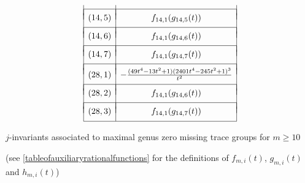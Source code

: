 \begin{table}[!ht]
\[\begin{array}{|c|c|}
& \\ [-.75em]
\hline 
& \\ [-.75em]
 (14,5) &  f_{14,1}(g_{14,5}(t)) \\
& \\ [-.75em]
\hline 
& \\ [-.75em]
(14,6) &  f_{14,1}(g_{14,6}(t))\\
& \\ [-.75em]
\hline 
& \\ [-.75em]
(14,7) &  f_{14,1}(g_{14,7}(t)) \\
& \\ [-.75em]
\hline
& \\ [-.75em]
(28,1) & - \frac{(49t^4 - 13t^2 + 1)(2401t^4 - 245t^2 + 1)^3}{t^2} \\
& \\ [-.75em]
\hline
& \\ [-.75em]
 (28,2) & f_{14,1}(g_{14,6}(t)) \\
& \\ [-.75em]
\hline 
& \\ [-.75em]
(28,3) &  f_{14,1}(g_{14,7}(t)) \\ [.5em]

\hline 
\end{array}
\]

\vspace{.1in}
\caption{ $j$-invariants associated to maximal genus zero missing trace groups for $m\geq10$}
\label{masterlistofjinvariants2}
\begin{center}
(see \ref{tableofauxiliaryrationalfunctions} for the definitions of $f_{m,i}(t)$, $g_{m,i}(t)$ and $h_{m,i}(t)$)
\end{center}
\end{table}
